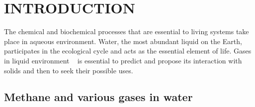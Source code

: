 \chapter{INTRODUCTION} \label{chap:1}
The chemical and biochemical processes that are essential to living systems take
place in aqueous environment. Water, the most abundant liquid on the Earth,
participates in the ecological cycle and acts as the essential element of life. 
Gases in liquid environment ~\citep{Hummer1998} is essential to predict and propose  its interaction with solids and then to seek their possible uses.

\section{Methane  and various gases in water}
